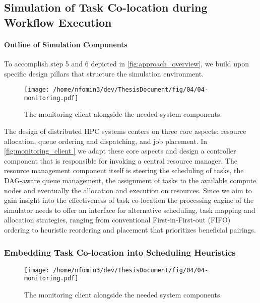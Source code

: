 \subsection{Simulation of Task Co-location during Workflow Execution}
\label{sec:simulation_environment}

\paragraph{Outline of Simulation Components}
\label{sec:design_pillars}

To accomplish step 5 and 6 depicted in \ref{fig:approach_overview}, we build upon specific design pillars that structure the simulation environment.

\begin{figure}[htbp]
    \centering
    \texttt{[image: /home/nfomin3/dev/ThesisDocument/fig/04/04-monitoring.pdf]} %
    \caption{The monitoring client alongside the needed system components.}
    \label{fig:monitoring_client}
\end{figure}

The design of distributed HPC systems centers on three core aspects: resource allocation, queue ordering and dispatching, and job placement. In \ref{fig:monitoring_client } we adapt these core aspects and design a controller component that is responsible for invoking a central resource manager. The resource management component itself is steering the scheduling of tasks, the DAG-aware queue management, the assignment of tasks to the available compute nodes and eventually the allocation and execution on resources.
Since we aim to gain insight into the effectiveness of task co-location the processing engine of the simulator needs to offer an interface for alternative scheduling, task mapping and allocation strategies, ranging from conventional First-in-First-out (FIFO) ordering to heuristic reordering and placement that prioritizes beneficial pairings.

\subsubsection{Embedding Task Co-location into Scheduling Heuristics}
\label{sec:heuristic_design}

\begin{figure}[htbp]
    \centering
    \texttt{[image: /home/nfomin3/dev/ThesisDocument/fig/04/04-monitoring.pdf]} %
    \caption{The monitoring client alongside the needed system components.}
    \label{fig:monitoring_client}
\end{figure}

